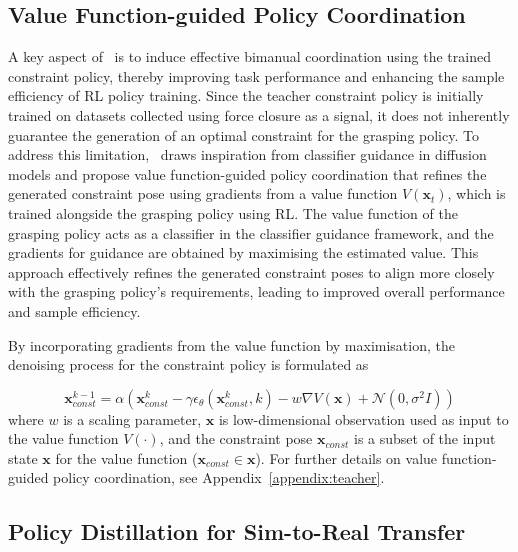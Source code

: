 \subsection{Value Function-guided Policy Coordination}
\label{sec:steering}
A key aspect of \ourmethod~is to induce effective bimanual coordination using the trained constraint policy, thereby improving task performance and enhancing the sample efficiency of RL policy training. 
Since the teacher constraint policy is initially trained on datasets collected using force closure as a signal, it does not inherently guarantee the generation of an optimal constraint for the grasping policy. 
To address this limitation, \ourmethod~draws inspiration from classifier guidance in diffusion models and propose value function-guided policy coordination that refines the generated constraint pose using gradients from a value function $V(\mathbf{x}_{t})$, which is trained alongside the grasping policy using RL.
The value function of the grasping policy acts as a classifier in the classifier guidance framework, and the gradients for guidance are obtained by maximising the estimated value.
This approach effectively refines the generated constraint poses to align more closely with the grasping policy's requirements, leading to improved overall performance and sample efficiency.

By incorporating gradients from the value function by maximisation, the denoising process for the constraint policy is formulated as

\begin{equation}
\label{eq:guidance}
    \mathbf{x}^{k-1}_{const} = \alpha(\mathbf{x}^{k}_{const} - \gamma \epsilon_{\theta}(\mathbf{x}^{k}_{const}, k) - w\nabla V(\mathbf{x}) + \mathcal{N}(0, \sigma^2I))
\end{equation}
where $w$ is a scaling parameter, $\mathbf{x}$ is low-dimensional observation used as input to the value function $V(\cdot)$, and the constraint pose $\mathbf{x}_{const}$ is a subset of the input state $\mathbf{x}$ for the value function (\ie $\mathbf{x}_{const} \in \mathbf{x}$).
For further details on value function-guided policy coordination, see Appendix~\ref{appendix:teacher}.









\subsection{Policy Distillation for Sim-to-Real Transfer}
\label{sec:distillation}

